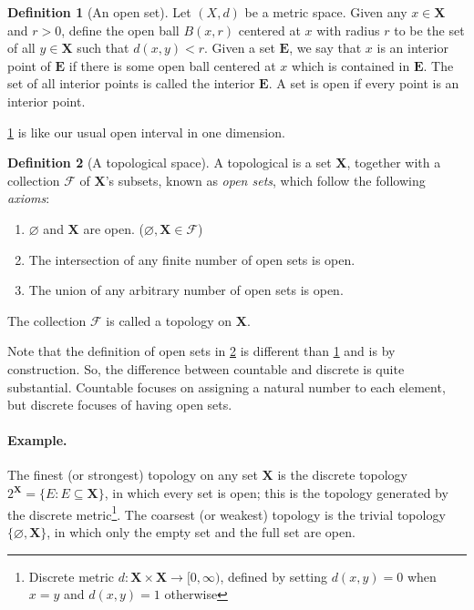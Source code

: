 \documentclass[a4paper]{article}
\theoremstyle{definition}
\newtheorem{definition}{Definition}
\theoremstyle{remark}
\theoremstyle{plain}
\newcommand{\bE}{\mathbf{E}}
\newcommand{\sF}{\mathscr{F}}
\newcommand{\bX}{\mathbf{X}}
\begin{document}
%
\begin{definition}[An open set]
    \label{def:opn-set}
    Let $(X, d)$ be a metric space. Given any $x \in \bX$ and $r > 0$, define the open ball $B(x, r)$ centered at $x$ with radius $r$ to be the set of all $y \in \bX$ such that $d(x, y) < r$. Given a set $\bE$, we say that $x$ is an interior point of $\bE$ if there is some open ball centered at $x$ which is contained in $\bE$. The set of all interior points is called the interior $\bE$.  A set is open if every point is an interior point.
\end{definition}
\cref{def:opn-set} is like our usual open interval in one dimension.
%
\begin{definition}[A topological space]
    \label{def:tplgcl-spc}
    A topological is a set $\bX$, together with a collection $\sF$ of $\bX$'s subsets, known as \emph{open sets}, which follow the following \emph{axioms}:
    \begin{enumerate}[label=(\Alph*)]
        \item $\varnothing$ and $\bX$ are open. ($\varnothing, \bX \in \sF$)
        \item The intersection of any finite number of open sets is open.
        \item The union of any arbitrary number of open sets is open.
    \end{enumerate}
    The collection $\sF$ is called a topology on $\bX$.
\end{definition}
Note that the definition of open sets in \cref{def:tplgcl-spc} is different than \cref{def:opn-set} and is by construction. So, the difference between countable and discrete is quite substantial. Countable focuses on assigning a natural number to each element, but discrete focuses of having open sets.

\paragraph{Example.} The finest (or strongest) topology on any set $\bX$ is the discrete topology $2^\bX = \{E: E \subseteq \bX\}$, in which every set is open; this is the topology generated by the discrete metric\footnote{Discrete metric $d: \bX \times \bX \to [0, \infty)$, defined by setting $d(x,y) = 0$ when $x=y$ and $d(x,y)=1$ otherwise}.  The coarsest (or weakest) topology is the trivial topology $\{\varnothing, \bX\}$, in which only the empty set and the full set are open. 
\end{document}
